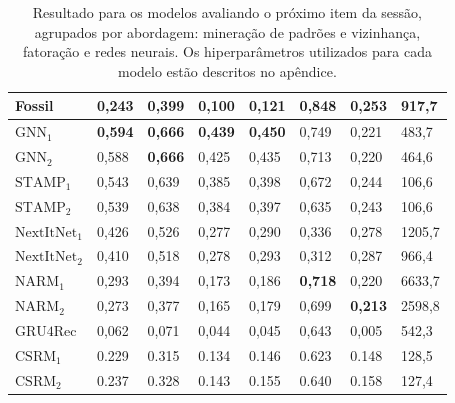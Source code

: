 \begin{table}[htbp]
\begin{tabular}{|l|l|l|l|l|l|l|l|}
    \hline
    \hline
    Fossil & 0,243 & 0,399 & 0,100 & 0,121 & \textbf{0,848} & 0,253 & 917,7 \\
    \hline
    $\text{GNN}_1$ & \textbf{0,594} & \textbf{0,666} & \textbf{0,439} & \textbf{0,450} & 0,749 & 0,221 & 483,7 \\
    \hline
    $\text{GNN}_2$ & 0,588 & \textbf{0,666} & 0,425 & 0,435 & 0,713 & 0,220 & 464,6 \\
    \hline
    $\text{STAMP}_1$ & 0,543 & 0,639 & 0,385 & 0,398 & 0,672 & 0,244 & 106,6 \\
    \hline
    $\text{STAMP}_2$ & 0,539 & 0,638 & 0,384 & 0,397 & 0,635 & 0,243 & 106,6 \\
    \hline  
    $\text{NextItNet}_1$ & 0,426 & 0,526 & 0,277 & 0,290 & 0,336 & 0,278 & 1205,7 \\
    \hline
    $\text{NextItNet}_2$ & 0,410 & 0,518 & 0,278 & 0,293 & 0,312 & 0,287 & 966,4 \\
    \hline
    $\text{NARM}_1$ & 0,293 & 0,394 & 0,173 & 0,186 & \textbf{0,718} & 0,220 & 6633,7 \\
    \hline
    $\text{NARM}_2$ &  0,273 & 0,377 & 0,165 & 0,179 & 0,699 & \textbf{0,213} & 2598,8 \\
    \hline
    $\text{GRU4Rec}$ & 0,062 & 0,071 & 0,044 & 0,045 & 0,643 & 0,005 & 542,3 \\
    \hline
    $\text{CSRM}_1$ & 0.229 & 0.315 & 0.134 & 0.146 & 0.623 & 0.148 &  128,5 \\
    \hline
    $\text{CSRM}_2$ & 0.237 & 0.328 & 0.143 & 0.155 & 0.640 & 0.158 & 127,4 \\
    \hline
  
      \end{tabular}
  \caption{Resultado para os modelos avaliando o próximo item da sessão, agrupados por
  abordagem: mineração de padrões e vizinhança, fatoração e redes neurais.
  Os hiperparâmetros utilizados para cada modelo estão descritos no apêndice.}
  \label{tab_baseline}  
\end{table}

